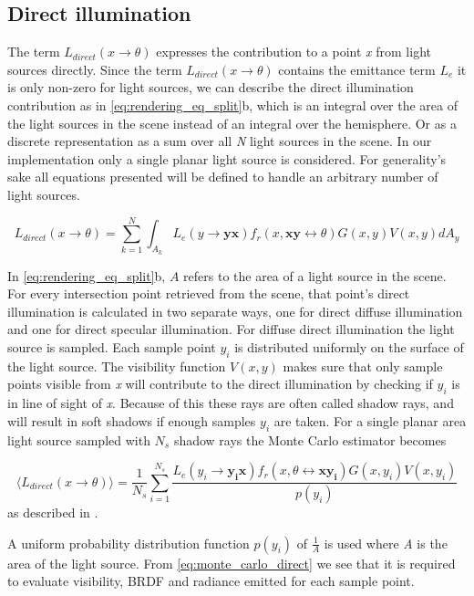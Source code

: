 \documentclass[a4paper, 12pt]{report}
\begin{document}
\subsection{Direct illumination}
The term $L_{direct}(x \rightarrow \theta)$ expresses the contribution to a point \emph{x} from light sources directly.
Since the term $L_{direct}(x \rightarrow \theta)$ contains the emittance term $L_e$ it is only non-zero for light sources, we can describe the direct illumination contribution as in \autoref{eq:rendering_eq_split}b, which is an integral over the area of the light sources in the scene instead of an integral over the hemisphere.
Or as a discrete representation as a sum over all \emph{N} light sources in the scene.
In our implementation only a single planar light source is considered.
For generality's sake all equations presented will be defined to handle an arbitrary number of light sources.

\begin{equation}
\label{eq:disc_direct}
L_{direct}(x \rightarrow \theta) = \sum^{N}_{k=1} \int_{A_k}L_e(y \rightarrow \mathbf{yx}) f_r(x, \mathbf{xy}\leftrightarrow \theta)G(x,y)V(x,y)dA_y
\end{equation}

In \autoref{eq:rendering_eq_split}b, $A$ refers to the area of a light source in the scene.
For every intersection point retrieved from the scene, that point's direct illumination is calculated in two separate ways, one for direct diffuse illumination and one for direct specular illumination.
For diffuse direct illumination the light source is sampled.
Each sample point $y_i$ is distributed uniformly on the surface of the light source.
The visibility function $V(x,y)$ makes sure that only sample points visible from \emph{x} will contribute to the direct illumination by checking if $y_i$ is in line of sight of \emph{x}.
Because of this these rays are often called shadow rays, and will result in soft shadows if enough samples $y_i$ are taken.
For a single planar area light source sampled with $N_s$ shadow rays the Monte Carlo estimator becomes

\begin{equation}
\label{eq:monte_carlo_direct}
\langle L_{direct}(x \rightarrow \theta) \rangle = \frac{1}{N_s} \sum^{N_s}_{i=1} \frac{L_e(y_i \rightarrow \mathbf{y_ix}) f_r(x, \theta \leftrightarrow \mathbf{xy_i})G(x,y_i)V(x,y_i)}{p(y_i)}
\end{equation}
as described in \cite{dutre}.

A uniform probability distribution function $p(y_i)$ of $\frac{1}{A}$ is used where \emph{A} is the area of the light source.
From \autoref{eq:monte_carlo_direct} we see that it is required to evaluate visibility, BRDF and radiance emitted for each sample point.
\end{document}
